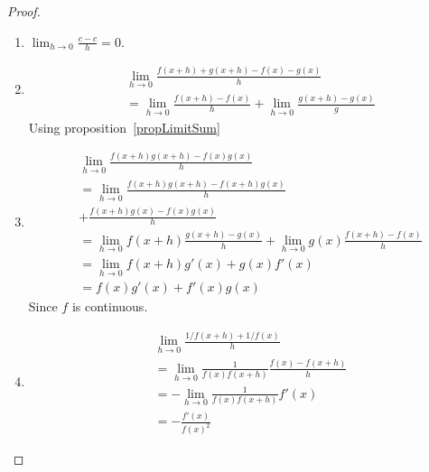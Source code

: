 \documentclass[../Main.tex]{subfiles}
\begin{document}
\begin{proof}
    \begin{enumerate}
        \item $\lim_{h \to 0} \frac{c - c}{h} = 0$.
        \item
            \begin{align*}
                &\lim_{h \to 0} \frac{f(x + h) + g(x + h) - f(x) - g(x)}{h} \\
                &= \lim_{h \to 0} \frac{f(x + h) - f(x)}{h} + \lim_{h \to 0} \frac{g(x + h) - g(x)}{g}
            \end{align*}
            Using proposition~\ref{propLimitSum}
        \item 
            \begin{align*}
                &\lim_{h \to 0} \frac{f(x + h)g(x + h) - f(x) g(x)}{h} \\
                &= \lim_{h \to 0} \frac{f(x + h) g(x + h) - f(x + h) g(x)}{h} \\
                &+\frac{f(x + h) g(x) - f(x) g(x)}{h} \\
                &= \lim_{h \to 0} f(x + h) \frac{g(x + h) - g(x)}{h} + \lim_{h \to 0} g(x) \frac{f(x + h) - f(x)}{h} \\
                &= \lim_{h \to 0} f(x + h) g'(x) + g(x) f'(x) \\
                &= f(x) g'(x) + f'(x) g(x)
            \end{align*}
            Since $f$ is continuous.
        \item 
            \begin{align*}
                &\lim_{h \to 0} \frac{1/f(x + h) + 1/f(x)}{h} \\
                &= \lim_{h \to 0} \frac{1}{f(x) f(x + h)} \frac{f(x) - f(x + h)}{h} \\
                &= -\lim_{h \to 0} \frac{1}{f(x) f(x + h)} f'(x) \\
                &= -\frac{f'(x)}{f(x)^2}
            \end{align*}
    \end{enumerate}
\end{proof}
\end{document}
